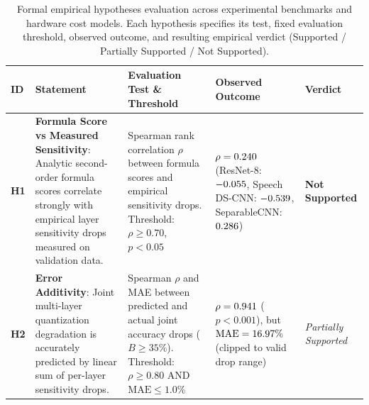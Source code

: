 \begin{table}[!t]
\centering
\caption{Formal empirical hypotheses evaluation across experimental benchmarks and hardware cost models. Each hypothesis specifies its test, fixed evaluation threshold, observed outcome, and resulting empirical verdict (Supported / Partially Supported / Not Supported).}
\label{tab:hypotheses}
\scriptsize
\begin{tabularx}{\textwidth}{l p{3.6cm} p{3.2cm} X p{2.4cm}}
\toprule
\textbf{ID} & \textbf{Statement} & \textbf{Evaluation Test \& Threshold} & \textbf{Observed Outcome} & \textbf{Verdict} \\
\midrule
\textbf{H1} & \textbf{Formula Score vs Measured Sensitivity}: Analytic second-order formula scores correlate strongly with empirical layer sensitivity drops measured on validation data. & Spearman rank correlation $\rho$ between formula scores and empirical sensitivity drops. Threshold: $\rho \ge 0.70$, $p < 0.05$ & $\rho = 0.240$ (ResNet-8: $-0.055$, Speech DS-CNN: $-0.539$, SeparableCNN: $0.286$) & \textbf{Not Supported} \\
\midrule
\textbf{H2} & \textbf{Error Additivity}: Joint multi-layer quantization degradation is accurately predicted by linear sum of per-layer sensitivity drops. & Spearman $\rho$ and MAE between predicted and actual joint accuracy drops ($B \ge 35\%$). Threshold: $\rho \ge 0.80$ AND $\text{MAE} \le 1.0\%$ & $\rho = 0.941$ ($p < 0.001$), but $\text{MAE} = 16.97\%$ (clipped to valid drop range) & \textit{Partially Supported} \\
\midrule

\end{tabularx}
\end{table}

